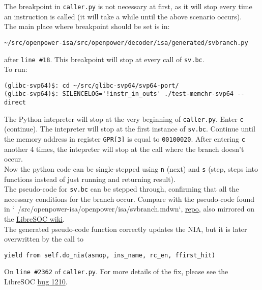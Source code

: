 The breakpoint in \texttt{caller.py} is not necessary at first, as it will
stop every time an instruction is called (it will take a while until the
above scenario occurs).\\

The main place where breakpoint should be set is in:

\begin{verbatim}
~/src/openpower-isa/src/openpower/decoder/isa/generated/svbranch.py
\end{verbatim}

after \texttt{line \#18}. This breakpoint will stop at
every call of \texttt{sv.bc}.\\

To run:
\begin{verbatim}
(glibc-svp64)$: cd ~/src/glibc-svp64/svp64-port/
(glibc-svp64)$: SILENCELOG='!instr_in_outs' ./test-memchr-svp64 --direct
\end{verbatim}

The Python intepreter will stop at the very beginning of \texttt{caller.py}.
Enter \texttt{c} (continue). The intepreter will stop at the first instance
of \texttt{sv.bc}. Continue until the memory address in register
\texttt{GPR[3]} is equal to \texttt{00100020}.
After entering \texttt{c} another 4 times, the intepreter will stop at the
call where the branch doesn't occur.\\

Now the python code can be single-stepped using \texttt{n} (next) and
\texttt{s} (step, steps into functions instead of just running
and returning result).\\

The pseudo-code for \texttt{sv.bc} can be stepped through,
confirming that all the necessary conditions for the branch occur.
Compare with the pseudo-code found in
`~/src/openpower-isa/openpower/isa/svbranch.mdwn`,
\href{https://git.libre-soc.org/?p=openpower-isa.git;a=blob;f=openpower/isa/svbranch.mdwn;h=e8b46e7700b44c6112ee2d873cc2e04b3c732370;hb=089e6d352ec57be4ab645d18ad9e95df3af0d365}{repo},
also mirrored on the
\href{https://libre-soc.org/openpower/isa/svbranch/}{LibreSOC wiki}.\\

The generated pseudo-code function correctly updates the \acrfull{NIA},
but it is later overwritten by the call to 
\begin{verbatim}
yield from self.do_nia(asmop, ins_name, rc_en, ffirst_hit)
\end{verbatim}

On \texttt{line \#2362} of \texttt{caller.py}. For more details of the fix,
please see the LibreSOC
\href{https://bugs.libre-soc.org/show_bug.cgi?id=1210}{bug 1210}.
